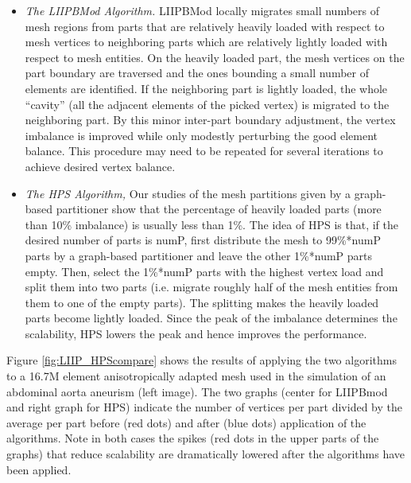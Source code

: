 \documentclass[letterpaper]{jpconf}
\begin{document}
\begin{itemize}
\item {\it The LIIPBMod Algorithm.}  LIIPBMod locally migrates small numbers
of mesh regions from parts that are relatively heavily loaded with
respect to mesh vertices to neighboring parts which are relatively
lightly loaded with respect to mesh entities. On the heavily loaded
part, the mesh vertices on the part boundary are traversed and the
ones bounding a small number of elements are identified. If the
neighboring part is lightly loaded, the whole ``cavity'' (all the
adjacent elements of the picked vertex) is migrated to the neighboring
part. By this minor inter-part boundary adjustment, the vertex
imbalance is improved while only modestly perturbing the good element
balance. This procedure may need to be repeated for several iterations
to achieve desired vertex balance.

\item {\it The HPS Algorithm,} Our studies of the mesh partitions given by a
graph-based partitioner show that the percentage of heavily loaded parts
(more than 10\% imbalance) is usually less than 1\%. The idea of HPS
is that, if the desired number of parts is numP, first distribute the
mesh to 99\%*numP parts by a graph-based partitioner and leave the
other 1\%*numP parts empty. Then, select the 1\%*numP parts with the
highest vertex load and split them into two parts (i.e. migrate
roughly half of the mesh entities from them to one of the empty
parts). The splitting makes the heavily loaded parts become lightly
loaded. Since the peak of the imbalance determines the scalability,
HPS lowers the peak and hence improves the performance. 
\end{itemize}
%

Figure \ref{fig:LIIP_HPScompare} shows the results of applying the
two algorithms to a 16.7M element anisotropically adapted mesh used in
the simulation of an abdominal aorta aneurism (left image). The two
graphs (center for LIIPBmod and right graph for HPS) indicate the
number of vertices per part divided by the average per part
before (red dots) and after (blue dots) application of the
algorithms. Note in both cases the spikes (red dots in the upper parts
of the graphs) that reduce scalability are dramatically lowered after
the algorithms have been applied.
\end{document}

